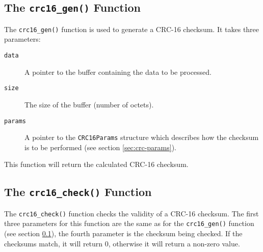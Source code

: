 \documentclass{article}
\begin{document}
\subsection{The \texttt{crc16\_gen()} Function}
\label{sec:crc-gen}
The \texttt{crc16\_gen()} function is used to generate a CRC-16
checksum.  It takes three parameters:
\begin{description}
\item[\texttt{data}]A pointer to the buffer containing the data to be
  processed.
\item[\texttt{size}]The size of the buffer (number of octets).
\item[\texttt{params}]A pointer to the \texttt{CRC16Params} structure
  which describes how the checksum is to be performed (see section
  \ref{sec:crc-params}).
\end{description}

This function will return the calculated CRC-16 checksum.

\subsection{The \texttt{crc16\_check()} Function}
The \texttt{crc16\_check()} function checks the validity of a CRC-16
checksum.  The first three parameters for this function are the same
as for the \texttt{crc16\_gen()} function (see section
\ref{sec:crc-gen}), the fourth parameter is the checksum being
checked.  If the checksums match, it will return 0, otherwise it will
return a non-zero value.
\end{document}
